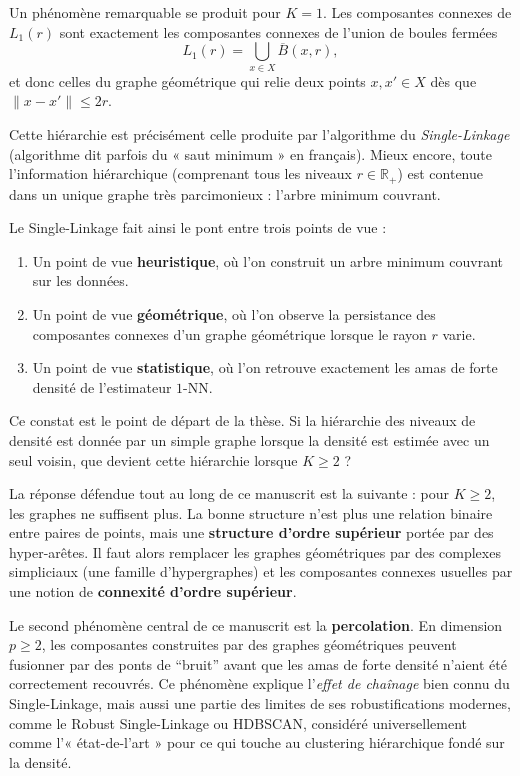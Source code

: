 Un phénomène remarquable se produit pour $K=1$. Les composantes connexes de $L_1(r)$ sont exactement les composantes connexes de l'union de boules fermées
\[
    L_1(r)
    =
    \bigcup_{x\in X} \overline B(x,r),
\]
et donc celles du graphe géométrique qui relie deux points $x,x'\in X$ dès que $\|x-x'\|\leq 2r$. 

Cette hiérarchie est précisément celle produite par l'algorithme du \emph{Single-Linkage} (algorithme dit parfois du « saut minimum » en français). Mieux encore, toute l'information hiérarchique (comprenant tous les niveaux $r \in \mathbb R_+$) est contenue dans un unique graphe très parcimonieux : l'arbre minimum couvrant.

Le Single-Linkage fait ainsi le pont entre trois points de vue :
\begin{enumerate}
    \item Un point de vue \textbf{heuristique}, où l'on construit un arbre minimum couvrant sur les données.
    \item Un point de vue \textbf{géométrique}, où l'on observe la persistance des composantes connexes d'un graphe géométrique lorsque le rayon $r$ varie.
    \item Un point de vue \textbf{statistique}, où l'on retrouve exactement les amas de forte densité de l'estimateur $1$-NN.
\end{enumerate}

Ce constat est le point de départ de la thèse. Si la hiérarchie des niveaux de densité est donnée par un simple graphe lorsque la densité est estimée avec un seul voisin, que devient cette hiérarchie lorsque $K\geq2$ ?

La réponse défendue tout au long de ce manuscrit est la suivante : pour $K\geq2$, les graphes ne suffisent plus. La bonne structure n'est plus une relation binaire entre paires de points, mais une \textbf{structure d'ordre supérieur} portée par des hyper-arêtes. Il faut alors remplacer les graphes géométriques par des complexes simpliciaux (une famille d'hypergraphes) et les composantes connexes usuelles par une notion de \textbf{connexité d'ordre supérieur}.

Le second phénomène central de ce manuscrit est la \textbf{percolation}. En dimension $p\geq2$, les composantes construites par des graphes géométriques peuvent fusionner par des ponts de ``bruit'' avant que les amas de forte densité n'aient été correctement recouvrés. Ce phénomène explique l'\emph{effet de chaînage} bien connu du Single-Linkage, mais aussi une partie des limites de ses robustifications modernes, comme le Robust Single-Linkage ou HDBSCAN, considéré universellement comme l'« état-de-l'art » pour ce qui touche au clustering hiérarchique fondé sur la densité.

